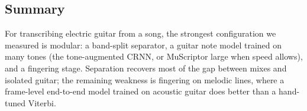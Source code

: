 \subsection{Summary}
For transcribing electric guitar from a song, the strongest configuration we
measured is modular: a band-split separator, a guitar note model trained on
many tones (the tone-augmented CRNN, or MuScriptor large when speed allows),
and a fingering stage. Separation recovers most of the gap between mixes and
isolated guitar; the remaining weakness is fingering on melodic lines, where
a frame-level end-to-end model trained on acoustic guitar does better than a
hand-tuned Viterbi.
